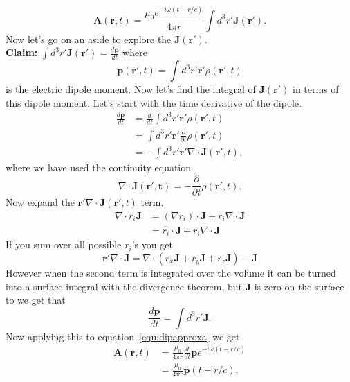 \documentclass[12pt]{article}
\newcommand{\br}{\mathbf{r}}
\newcommand{\pd}{\dot{\mathbf{p}}}
\begin{document}
\begin{equation}
   \mathbf{A}(\br,t) = \frac{\mu_0e^{-i\omega(t-r/c)}}{4\pi r} \int d^3r' \mathbf{J}(\br').
   \label{equ:dipapproxa}
\end{equation}
Now let's go on an aside to explore the $\mathbf{J}(\br')$. \\
\textbf{Claim:} $\int d^3r' \mathbf{J}(\br') = \frac{d\mathbf{p}}{dt}$ where
\begin{equation}
   \mathbf{p}(\br',t) = \int d^3r' \br'\rho(\br',t)
\end{equation}
is the electric dipole moment. Now let's find the integral of $\mathbf{J}(\br')$ in terms of this dipole moment. Let's start with the time derivative of the dipole.
\begin{align}
   \frac{d\mathbf{p}}{dt} &= \frac{d}{dt}\int d^3r' \br'\rho(\br',t) \\
   &= \int d^3r' \br' \frac{\partial}{\partial t}\rho(\br',t) \\
   &= -\int d^3r' \br' \nabla \cdot \mathbf{J}(\br',t),
\end{align}
where we have used the continuity equation
\begin{equation}
   \nabla \cdot \mathbf{J(\br',t)} = -\frac{\partial}{\partial t} \rho(\br',t).
\end{equation}
Now expand the $\br' \nabla \cdot \mathbf{J}(\br',t)$ term.
\begin{align}
   \nabla \cdot r_i\mathbf{J} &= (\nabla r_i) \cdot \mathbf{J} + r_i\nabla\cdot\mathbf{J} \\
   &= \hat{r_i} \cdot \mathbf{J} + r_i\nabla\cdot\mathbf{J}
\end{align}
If you sum over all possible $r_i$'s you get
\begin{equation}
   \br'\nabla\cdot\mathbf{J} = \nabla\cdot (r_x\mathbf{J}+r_y\mathbf{J}+r_z\mathbf{J}) - \mathbf{J}
\end{equation}
However when the second term is integrated over the volume it can be turned into a surface integral with the divergence theorem, but $\mathbf{J}$ is zero on the surface to we get that
\begin{equation}
   \frac{d\mathbf{p}}{dt} = \int d^3r' \mathbf{J}.
\end{equation}
Now applying this to equation~\ref{equ:dipapproxa} we get
\begin{align}
   \mathbf{A}(\br,t) &= \frac{\mu_0}{4\pi r} \frac{d}{dt}\mathbf{p}e^{-i\omega(t-r/c)} \\
   &= \frac{\mu_0}{4\pi r} \pd(t-r/c),
\end{align}
\end{document}
